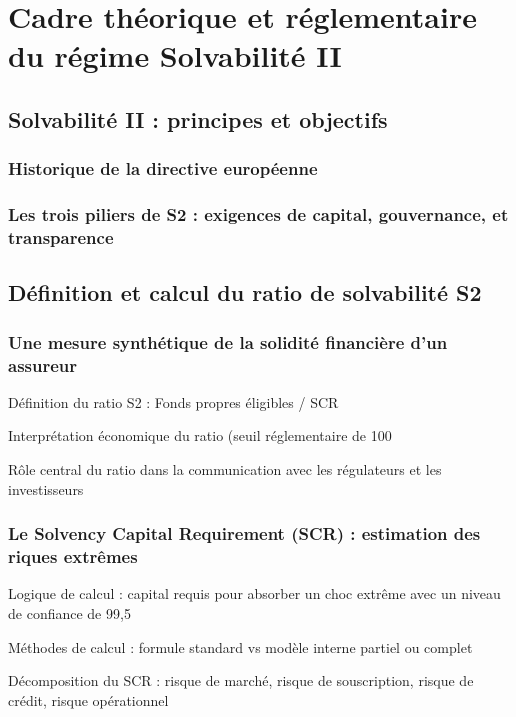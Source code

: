 \chapter{Cadre théorique et réglementaire du régime Solvabilité II}
\label{chap:contexte}
\newpage
\section{Solvabilité II : principes et objectifs}
\label{sec:spec_av}

\subsection{Historique de la directive européenne}

\subsection{Les trois piliers de S2 : exigences de capital, gouvernance, et transparence}


\section{Définition et calcul du ratio de solvabilité S2}
\label{sec:s2}


\subsection{Une mesure synthétique de la solidité financière d'un assureur}

Définition du ratio S2 : Fonds propres éligibles / SCR

Interprétation économique du ratio (seuil réglementaire de 100 %

Rôle central du ratio dans la communication avec les régulateurs et les investisseurs

\subsection{Le Solvency Capital Requirement (SCR) : estimation des riques extrêmes}

Logique de calcul : capital requis pour absorber un choc extrême avec un niveau de confiance de 99,5 %

Méthodes de calcul : formule standard vs modèle interne partiel ou complet

Décomposition du SCR : risque de marché, risque de souscription, risque de crédit, risque opérationnel

